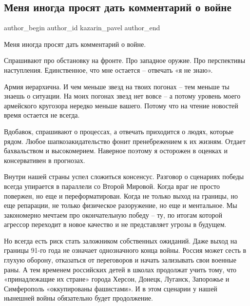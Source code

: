  
 
 
 
 

\subsection{Меня иногда просят дать комментарий о войне}
\label{sec:24_01_2023.fb.kazarin_pavel.1.menya_inogda_prosyat}

\ifcmt
 author_begin
   author_id kazarin_pavel
 author_end
\fi

Меня иногда просят дать комментарий о войне. 

Спрашивают про обстановку на фронте. Про западное оружие. Про перспективы
наступления. Единственное, что мне остается – отвечать «я не знаю». 

Армия иерархична. И чем меньше звезд на твоих погонах – тем меньше ты знаешь о
ситуации. На моих погонах звезд нет вовсе – а потому уровень моего армейского
кругозора нередко меньше вашего. Потому что на чтение новостей время остается
не всегда. 

Вдобавок, спрашивают о процессах, а отвечать приходится о людях, которые рядом.
Любое шапкозакидательство фонит пренебрежением к их жизням. Отдает бахвальством
и высокомерием. Наверное поэтому я осторожен в оценках и консервативен в
прогнозах. 

Внутри нашей страны успел сложиться консенсус. Разговор о сценариях победы
всегда упирается в параллели со Второй Мировой. Когда враг не просто повержен,
но еще и переформатирован. Когда не только выход на границы, но еще репарации,
не только физическое разоружение, но еще и ментальное. Мы закономерно мечтаем
про окончательную победу – ту, по итогам которой агрессор переходит в новое
качество и не представляет угрозы в будущем. 

Но всегда есть риск стать заложником собственных ожиданий. Даже выход на
границы 91-го года не означает однозначного конца войны. Россия может сесть в
глухую оборону, отказаться от переговоров и начать зализывать свои военные
раны. А тем временем российских детей в школах продолжат учить тому, что
«принадлежащие их стране» города Херсон, Донецк, Луганск, Запорожье и
Симферополь «оккупированы фашистами». И в этом сценарии у нашей нынешней войны
обязательно будет продолжение. 

